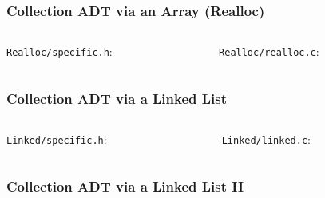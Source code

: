 
\begin{frame}[fragile]
\frametitle{Collection ADT via an Array (Realloc)}
\begin{columns}[T]

\begin{column}{0.45\textwidth}
\verb^Realloc/specific.h^:

\end{column}

\pause
\begin{column}{0.45\textwidth}
\verb^Realloc/realloc.c^:

\end{column}

\end{columns}
\end{frame}


\begin{frame}[fragile]
\frametitle{Collection ADT via a Linked List}
\begin{columns}[T]

\begin{column}{0.45\textwidth}
\verb^Linked/specific.h^:

\end{column}

\pause
\begin{column}{0.45\textwidth}
\verb^Linked/linked.c^:

\end{column}

\end{columns}
\end{frame}


\begin{frame}[fragile]
\frametitle{Collection ADT via a Linked List II}
\begin{columns}[T]

\begin{column}{0.45\textwidth}

\end{column}

\pause
\begin{column}{0.45\textwidth}

\end{column}

\end{columns}
\end{frame}

